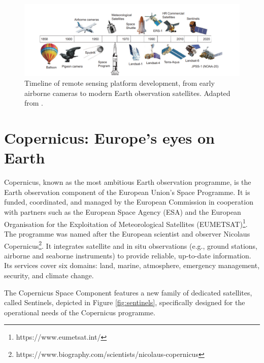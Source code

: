 \begin{figure}[H]
  \centering
  \includegraphics[width=\textwidth]{img/RS_timeline.png}
  \caption[Timeline of remote sensing platform development]{Timeline of remote sensing platform development, from early airborne cameras to modern Earth observation satellites. Adapted from \cite{book_Satellite_RS}.}
  \label{fig:RS_timeline}
\end{figure}

\section{Copernicus: Europe's eyes on Earth}
Copernicus, known as the most ambitious Earth observation programme, is the Earth observation component of the European Union's Space Programme.
It is funded, coordinated, and managed by the European Commission in cooperation with partners such as the European Space Agency (ESA) and the European Organisation for the Exploitation of Meteorological Satellites (EUMETSAT)\footnote{https://www.eumetsat.int/}. The programme was named after the European scientist and observer Nicolaus Copernicus\footnote{https://www.biography.com/scientists/nicolaus-copernicus}. It integrates satellite and in situ observations (e.g., ground stations, airborne and seaborne instruments) to provide reliable, up-to-date information. Its services cover six domains: land, marine, atmosphere, emergency management, security, and climate change. 

The Copernicus Space Component features a new family of dedicated satellites,
called Sentinels, depicted in Figure \ref{fig:sentinels}, specifically designed for the operational needs of the Copernicus programme. 

